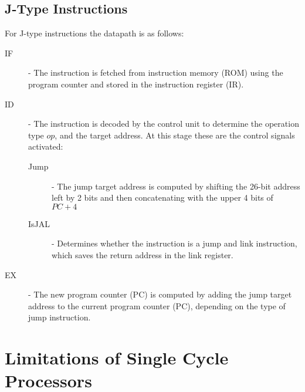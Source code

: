 \documentclass[12pt letter]{report}
\begin{document}
\section{J-Type Instructions}
For J-type instructions the datapath is as follows:
\begin{description}
  \item[IF]  - The instruction is fetched from instruction memory (ROM) using the program counter and stored in the instruction register (IR).
  \item[ID] - The instruction is decoded by the control unit to determine the operation type $op$, and the target address. At this stage these are the control signals activated:
        \begin{description}
          \item[Jump] - The jump target address is computed by shifting the 26-bit address left by 2 bits and then concatenating with the upper 4 bits of $PC + 4$
          \item[IsJAL] - Determines whether the instruction is a jump and link instruction, which saves the return address in the link register.
        \end{description}
  \item[EX] - The new program counter (PC) is computed by adding the jump target address to the current program counter (PC), depending on the type of jump instruction.
\end{description}

\chapter{Limitations of Single Cycle Processors}
\end{document}
